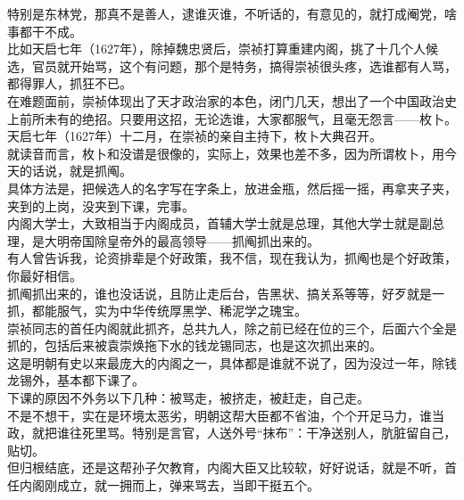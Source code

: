 \begin{multicols}{\theparacolNo}
特别是东林党，那真不是善人，逮谁灭谁，不听话的，有意见的，就打成阉党，啥事都干不成。\\

比如天启七年（1627年），除掉魏忠贤后，崇祯打算重建内阁，挑了十几个人候选，官员就开始骂，这个有问题，那个是特务，搞得崇祯很头疼，选谁都有人骂，都得罪人，抓狂不已。\\

在难题面前，崇祯体现出了天才政治家的本色，闭门几天，想出了一个中国政治史上前所未有的绝招。只要用这招，无论选谁，大家都服气，且毫无怨言——枚卜。\\

天启七年（1627年）十二月，在崇祯的亲自主持下，枚卜大典召开。\\

就读音而言，枚卜和没谱是很像的，实际上，效果也差不多，因为所谓枚卜，用今天的话说，就是抓阄。\\

具体方法是，把候选人的名字写在字条上，放进金瓶，然后摇一摇，再拿夹子夹，夹到的上岗，没夹到下课，完事。\\

内阁大学士，大致相当于内阁成员，首辅大学士就是总理，其他大学士就是副总理，是大明帝国除皇帝外的最高领导——抓阄抓出来的。\\

有人曾告诉我，论资排辈是个好政策，我不信，现在我认为，抓阄也是个好政策，你最好相信。\\

抓阄抓出来的，谁也没话说，且防止走后台，告黑状、搞关系等等，好歹就是一抓，都能服气，实为中华传统厚黑学、稀泥学之瑰宝。\\

崇祯同志的首任内阁就此抓齐，总共九人，除之前已经在位的三个，后面六个全是抓的，包括后来被袁崇焕拖下水的钱龙锡同志，也是这次抓出来的。\\

这是明朝有史以来最庞大的内阁之一，具体都是谁就不说了，因为没过一年，除钱龙锡外，基本都下课了。\\

下课的原因不外务以下几种：被骂走，被挤走，被赶走，自己走。\\

不是不想干，实在是环境太恶劣，明朝这帮大臣都不省油，个个开足马力，谁当政，就把谁往死里骂。特别是言官，人送外号“抹布”：干净送别人，肮脏留自己，贴切。\\

但归根结底，还是这帮孙子欠教育，内阁大臣又比较软，好好说话，就是不听，首任内阁刚成立，就一拥而上，弹来骂去，当即干挺五个。\\


\end{multicols}

